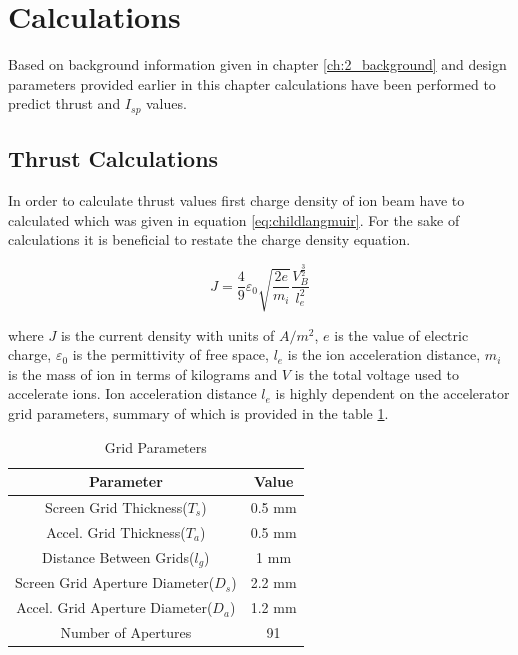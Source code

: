 \newpage

\section{Calculations}
Based on background information given in chapter \ref{ch:2_background} and design parameters provided earlier in this chapter calculations have been performed to predict thrust and $I_{sp}$ values. 
\subsection{Thrust Calculations}
In order to calculate thrust values first charge density of ion beam have to calculated which was given in equation \ref{eq:childlangmuir}. For the sake of calculations it is beneficial to restate the charge density equation. 

\begin{equation}
    J = \frac{4}{9}\varepsilon_0 \sqrt{\frac{2e}{m_i}}\frac{V^{\frac{3}{2}}_B}{l_{e}^2}
    \label{eq:childlangch3}
\end{equation}

where $J$ is the current density with units of $A/m^2$, $e$ is the value of electric charge, $\varepsilon_0$ is the permittivity of free space, $l_e$ is the ion acceleration distance, $m_i$ is the mass of ion in terms of kilograms and $V$ is the total voltage used to accelerate ions. Ion acceleration distance $l_e$ is highly dependent on the accelerator grid parameters, summary of which is provided in the table \ref{table:gridparams}.

\begin{table}[ht]
    \centering
    \begin{tabular}{||c|c||}
        \hline
        \textbf{Parameter} & \textbf{Value} \\
        \hline
        Screen Grid Thickness($T_s$) & 0.5 mm \\
        \hline
        Accel. Grid Thickness($T_a$) & 0.5 mm \\
        \hline
        Distance Between Grids($l_g$) & 1 mm \\
        \hline
        Screen Grid Aperture Diameter($D_s$) & 2.2 mm \\
        \hline
        Accel. Grid Aperture Diameter($D_a$) & 1.2 mm \\
        \hline
        Number of Apertures & 91 \\
        \hline
    \end{tabular}
    \caption{Grid Parameters}
    \label{table:gridparams}
\end{table}

